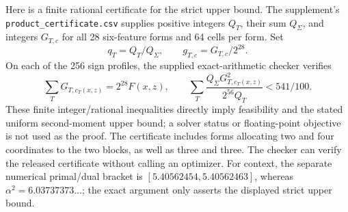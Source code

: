 Here is a finite rational certificate for the strict upper bound. The
supplement's \texttt{product\_certificate.csv} supplies positive integers
$Q_T$, their sum $Q_\Sigma$, and integers $G_{T,c}$ for all 28 six-feature
forms and 64 cells per form. Set
\[
 q_T=Q_T/Q_\Sigma,\qquad g_{T,c}=G_{T,c}/2^{28}.
\]
On each of the 256 sign profiles, the supplied exact-arithmetic checker
verifies
\[
 \sum_TG_{T,c_T(x,z)}=2^{28}F(x,z),\qquad
 \sum_T\frac{Q_\Sigma G_{T,c_T(x,z)}^2}{2^{56}Q_T}<541/100.
\]
These finite integer/rational inequalities directly imply feasibility
and the stated uniform second-moment upper bound; a solver status or
floating-point objective is not used as the proof. The certificate includes
forms allocating two and four coordinates to the two blocks, as well as
three and three. The checker can verify the released certificate without
calling an optimizer. For context, the separate numerical primal/dual
bracket is $[5.40562454,5.40562463]$, whereas $\alpha^2=6.03737373\ldots$;
the exact argument only asserts the displayed strict upper bound.
